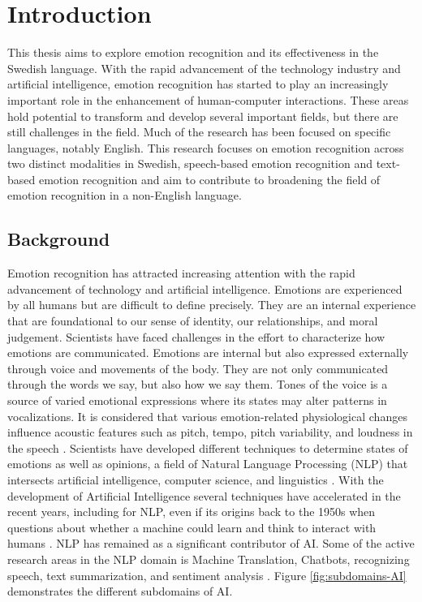 \chapter{Introduction}
This thesis aims to explore emotion recognition and its effectiveness in the Swedish language. With the rapid advancement of the technology industry and artificial intelligence, emotion recognition has started to play an increasingly important role in the enhancement of human-computer interactions. These areas hold potential to transform and develop several important fields, but there are still challenges in the field. Much of the research has been focused on specific languages, notably English. This research focuses on emotion recognition across two distinct modalities in Swedish, speech-based emotion recognition and text-based emotion recognition and aim to contribute to broadening the field of emotion recognition in a non-English language.

\section{Background}
Emotion recognition has attracted increasing attention with the rapid advancement of technology and artificial intelligence. Emotions are experienced by all humans but are difficult to define precisely. They are an internal experience that are foundational to our sense of identity, our relationships, and moral judgement. Scientists have faced challenges in the effort to characterize how emotions are communicated. Emotions are internal but also expressed externally through voice and movements of the body. They are not only communicated through the words we say, but also how we say them. Tones of the voice is a source of varied emotional expressions where its states may alter patterns in vocalizations. It is considered that various emotion-related physiological changes influence acoustic features such as pitch, tempo, pitch variability, and loudness in the speech \autocite{Oatley2019}.
Scientists have developed different techniques to determine states of emotions as well as opinions, a field of Natural Language Processing (NLP) that intersects artificial intelligence, computer science, and linguistics \autocite{Kansara2020}. With the development of Artificial Intelligence several techniques have accelerated in the recent years, including for NLP, even if its origins back to the 1950s when questions about whether a machine could learn and think to interact with humans \autocite{Alvarez2024}. NLP has remained as a significant contributor of AI. Some of the active research areas in the NLP domain is Machine Translation, Chatbots, recognizing speech, text summarization, and sentiment analysis \autocite{Kusal2023}. Figure \ref{fig:subdomains-AI} demonstrates the different subdomains of AI. 

